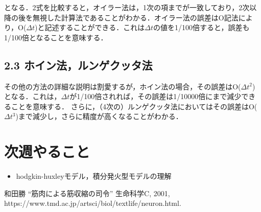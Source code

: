 \documentclass[dvipdfmx, A4j, twocolumn, 10.5pt]{jsarticle}
\begin{document}
となる．2式を比較すると，オイラー法は，1次の項までが一致しており，2次以降の後を無視した計算法であることがわかる．オイラー法の誤差はO記法により，O($\Delta t$)と記述することができる．これは$\Delta t$の値を1/100倍すると，誤差も1/100倍となることを意味する．

\subsection*{2.3 ホイン法，ルンゲクッタ法}
その他の方法の詳細な説明は割愛するが，ホイン法の場合，その誤差はO($\Delta t^2$)となる．これは，$\Delta t$が1/100倍されれば，その誤差は1/10000倍にまで減少できることを意味する．
さらに，（4次の）ルンゲクッタ法においてはその誤差はO($\Delta t^3$)まで減少し，さらに精度が高くなることがわかる．

\section*{次週やること}
\begin{itemize}
 \item hodgkin-huxleyモデル，積分発火型モデルの理解
\end{itemize}



\begin{thebibliography}{99}
 和田勝 ``筋肉による筋収縮の司令'' 生命科学C, 2001, https://www.tmd.ac.jp/artsci/biol/textlife/neuron.html.
\end{thebibliography}
\end{document}
